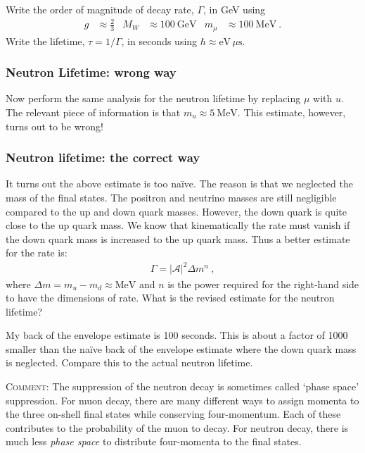 \documentclass[12pt]{article}
\begin{document}
Write the order of magnitude of decay rate, $\Gamma$, in GeV using
\begin{align}
	g&\approx \frac{2}{3}
	&
	M_W &\approx 100~\text{GeV}
	&
	m_\mu &\approx 100~\text{MeV} \ .
\end{align}
Write the lifetime, $\tau = 1/\Gamma$, in seconds using $\hbar \approx \text{eV} \, \mu\text{s}$.




\subsubsection{Neutron Lifetime: wrong way}


Now perform the same analysis for the neutron lifetime by replacing $\mu$ with $u$. The relevant piece of information is that $m_u \approx 5~\text{MeV}$. This estimate, however, turns out to be wrong!

\subsubsection{Neutron lifetime: the correct way}

It turns out the above estimate is too na\"ive. The reason is that we neglected the mass of the final states. The positron and neutrino masses are still negligible compared to the up and down quark masses. However, the down quark is quite close to the up quark mass. We know that kinematically the rate must vanish if the down quark mass is increased to the up quark mass. Thus a better estimate for the rate is:
\begin{align}
	\Gamma = |\mathcal A|^2 \Delta m^n \ ,
\end{align}
where $\Delta m = m_u - m_d \approx \text{MeV}$ and $n$ is the power required for the right-hand side to have the dimensions of rate. What is the revised estimate for the neutron lifetime? 

My back of the envelope estimate is 100 seconds. This is about a factor of 1000 smaller than the na\"ive back of the envelope estimate where the down quark mass is neglected. Compare this to the actual neutron lifetime.

\textsc{Comment}: The suppression of the neutron decay is sometimes called `phase space' suppression. For muon decay, there are many different ways to assign momenta to the three on-shell final states while conserving four-momentum. Each of these contributes to the probability of the muon to decay. For neutron decay, there is much less \emph{phase space} to distribute four-momenta to the final states. 
\end{document}
